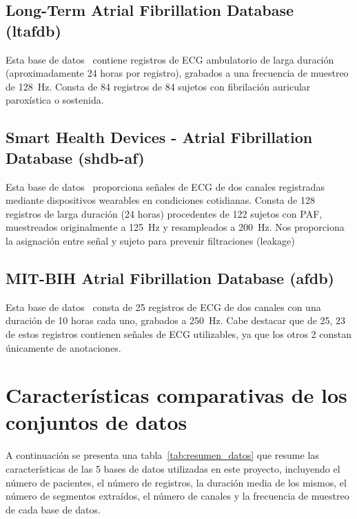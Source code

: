 \subsection{Long-Term Atrial Fibrillation Database (ltafdb)}
\label{subsec:ltafdb}
Esta base de datos~\cite{petrutiu_long-term_2003} contiene registros de ECG ambulatorio de
larga duración (aproximadamente 24 horas por registro), grabados a una frecuencia de muestreo
de 128~Hz. Consta de 84 registros de 84 sujetos con fibrilación auricular
paroxística o sostenida.

\subsection{Smart Health Devices - Atrial Fibrillation Database (shdb-af)}
\label{subsec:shdb}
Esta base de datos~\cite{PhysioNet-shdb-af-1.0.1} proporciona señales de ECG de dos
canales registradas mediante dispositivos wearables en condiciones cotidianas.
Consta de 128 registros
de larga duración (24 horas) procedentes de 122 sujetos con PAF,
muestreados originalmente a 125~Hz y resampleados a 200~Hz.
Nos proporciona la asignación entre señal y sujeto para prevenir filtraciones (leakage)

\subsection{MIT-BIH Atrial Fibrillation Database (afdb)}
\label{subsec:afdb}
Esta base de datos~\cite{moody_mit-bih_1992} consta de 25 registros de ECG de dos
canales con una duración de 10 horas cada uno, grabados a 250~Hz.
Cabe destacar que de 25, 23 de estos registros contienen señales de
ECG utilizables, ya que los otros 2 constan únicamente de anotaciones.

\section{Características comparativas de los conjuntos de datos}
\label{sec:caracteristicas_datos}

A continuación se presenta una tabla~\ref{tab:resumen_datos} que resume las características de las 5 bases de datos utilizadas
en este proyecto, incluyendo el número de pacientes, el número de registros, la duración
media de los mismos, el número de segmentos extraídos, el número de canales y la frecuencia de muestreo de cada base de datos.

